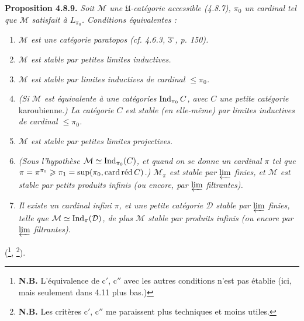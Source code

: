 \textbf{Proposition 4.8.9.} \textit{Soit $\mathcal{M}$ une $\mathfrak{U}$-catégorie accessible (4.8.7), $\pi_0$ un cardinal tel que $\mathcal{M}$ satisfait à $L_{\pi_0}$. Conditions équivalentes :}
\begin{enumerate}
\item[\textit{a)}] \textit{$\mathcal{M}$ est une catégorie paratopos (cf. 4.6.3, $3^\circ$, p. 150).}
\item[\textit{b)}] \textit{$\mathcal{M}$ est stable par petites limites inductives.}
\item[\textit{b$'$)}] \textit{$\mathcal{M}$ est stable par limites inductives de cardinal $\leqslant\pi_0$.}
\item[\textit{b$''$)}] \textit{(Si $\mathcal{M}$ est équivalente à une catégories} $\operatorname{Ind}_{\pi_0}C$\textit{, avec $C$ une petite catégorie} karoubienne.\textit{) La catégorie $C$ est stable (en elle-même) par limites inductives de cardinal $\leqslant\pi_0$.} %
\item[\textit{c)}] \textit{$\mathcal{M}$ est stable par petites limites projectives.}
\item[\textit{c$'$)}] \textit{(Sous l'hypothèse $\mathcal{M}\simeq\operatorname{Ind}_{\pi_0}(C)$, et quand on se donne un cardinal $\pi$ tel que $\pi=\pi^{\pi_0}\geqslant\pi_1=\sup(\pi_0,\operatorname{card}\textup{réd}\,C)$.) $\mathcal{M}_\pi$ est stable par $\varprojlim$ finies, et $\mathcal{M}$ est stable par petits produits infinis (ou encore, par $\varprojlim$ filtrantes).}
\item[\textit{c$''$)}] \textit{Il existe un cardinal infini $\pi$, et une petite catégorie $\mathcal{D}$ stable par $\varprojlim$ finies, telle que $\mathcal{M}\simeq\operatorname{Ind}_\pi(\mathcal{D})$, de plus $\mathcal{M}$ stable par produits infinis (ou encore par $\varprojlim$ filtrantes).}
\end{enumerate}
(\footnote{\textbf{N.B.} L'équivalence de c$'$, c$''$ avec les autres conditions n'est pas établie (ici, mais seulement dans 4.11 plus bas.)}, \footnote{\textbf{N.B.} Les critères c$'$, c$''$ me paraissent plus techniques et moins utiles.}).

